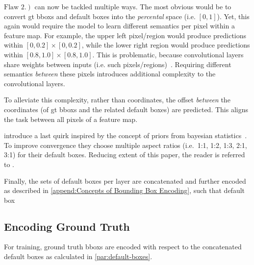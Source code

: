 \hyperref[itm:anchor-flaw2]{\(\left.\text{Flaw 2}.\right)\)} can now be tackled
multiple ways. The most obvious would be to convert \gls{gt} \glspl{bbox} and
default boxes into the \textit{percental} space (i.e. \(\left[0, 1\right]\)).
Yet, this again would require the model to learn different semantics per pixel
within a \gls{feature map}. For example, the upper left pixel/region would produce predictions
within \(\left[0,0.2\right]\times \left[0,0.2\right]\), while the lower right
region would produce predictions within \(\left[0.8,1.0\right]\times \left[0.8,1.0\right]\).
This is problematic, because \glspl{convolutional layer} share weights\footnotemark{}
between inputs (i.e. such pixels/regions)~\cite[cf.][564\psqq]{Murphy.2012}.
Requiring different semantics \emph{between} these pixels introduces additional
complexity to the \glspl{convolutional layer}.

To alleviate this complexity, rather than coordinates, the offset \emph{between}
the coordinates (of \gls{gt} \glspl{bbox} and the related default boxes) are predicted.
This aligns the task between all pixels of a \gls{feature map}.

\Textcite{Liu.2016} introduce a last quirk inspired by the concept of priors
from bayesian statistics~\cite[cf.][165\psqq]{Murphy.2012}. To improve convergence
they choose multiple aspect ratios (i.e.\ 1:1, 1:2, 1:3, 2:1, 3:1) for their
default boxes. Reducing extent of this paper, the reader is referred to \cite{Liu.2016}.

Finally, the sets of default boxes per \gls{layer} are concatenated and further
encoded as described in \cref{append:Concepts of Bounding Box Encoding}, such
that default box

\subsection{Encoding Ground Truth} For training, ground truth \glspl{bbox}
are encoded with respect to the concatenated default boxes as calculated in
\cref{par:default-boxes}. 


